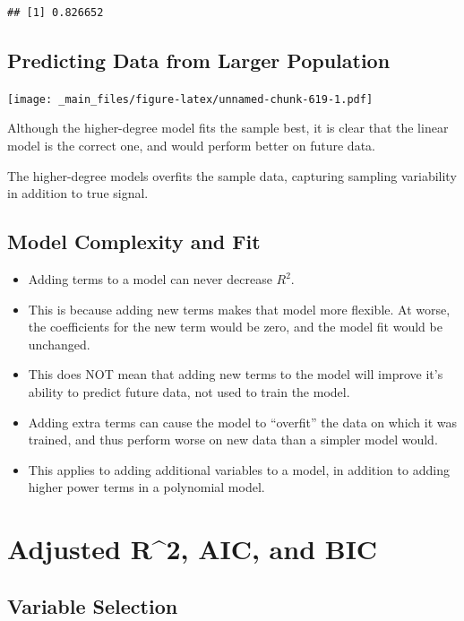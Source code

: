 \documentclass[]{book}
\begin{document}
\begin{verbatim}
## [1] 0.826652
\end{verbatim}

\subsection{Predicting Data from Larger
Population}\label{predicting-data-from-larger-population}

\texttt{[image: \_main\_files/figure-latex/unnamed-chunk-619-1.pdf]}

Although the higher-degree model fits the sample best, it is clear that
the linear model is the correct one, and would perform better on future
data.

The higher-degree models overfits the sample data, capturing sampling
variability in addition to true signal.

\subsection{Model Complexity and Fit}\label{model-complexity-and-fit}

\begin{itemize}
\item
  Adding terms to a model can never decrease \(R^2\).
\item
  This is because adding new terms makes that model more flexible. At
  worse, the coefficients for the new term would be zero, and the model
  fit would be unchanged.
\item
  This does NOT mean that adding new terms to the model will improve
  it's ability to predict future data, not used to train the model.
\item
  Adding extra terms can cause the model to ``overfit'' the data on
  which it was trained, and thus perform worse on new data than a
  simpler model would.
\item
  This applies to adding additional variables to a model, in addition to
  adding higher power terms in a polynomial model.
\end{itemize}

\section{Adjusted R\^{}2, AIC, and BIC}\label{adjusted-r2-aic-and-bic}

\subsection{Variable Selection}\label{variable-selection}
\end{document}
